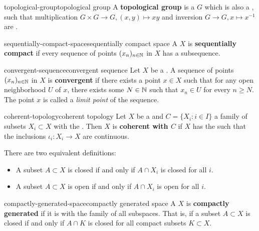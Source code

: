 \begin{topic}{topological-group}{topological group}
    A \textbf{topological group} is a  $G$ which is also a , such that multiplication $G \times G \to G, (x, y) \mapsto xy$ and inversion $G \to G, x \mapsto x^{-1}$ are .
\end{topic}

\begin{topic}{sequentially-compact-space}{sequentially compact space}
    A  $X$ is \textbf{sequentially compact} if every sequence of points $(x_n)_{n \in \mathbb{N}}$ in $X$ has a  subsequence.
\end{topic}

\begin{topic}{convergent-sequence}{convergent sequence}
    Let $X$ be a . A sequence of points $(x_n)_{n \in \mathbb{N}}$ in $X$ is \textbf{convergent} if there exists a point $x \in X$ such that for any open neighborhood $U$ of $x$, there exists some $N \in \mathbb{N}$ such that $x_n \in U$ for every $n \ge N$. The point $x$ is called a \textit{limit point} of the sequence.
\end{topic}

\begin{topic}{coherent-topology}{coherent topology}
    Let $X$ be a  and $C = \{ X_i : i \in I \}$ a family of subsets $X_i \subset X$ with the . Then $X$ is \textbf{coherent with $C$} if $X$ has the  such that the inclusions $\iota_i : X_i \to X$ are continuous.
    
    There are two equivalent definitions:
    \begin{itemize}
        \item A subset $A \subset X$ is closed if and only if $A \cap X_i$ is closed for all $i$.
        \item A subset $A \subset X$ is open if and only if $A \cap X_i$ is open for all $i$.
    \end{itemize}
\end{topic}

\begin{topic}{compactly-generated-space}{compactly generated space}
    A  $X$ is \textbf{compactly generated} if it is  with the family of all  subspaces. That is, if a subset $A \subset X$ is closed if and only if $A \cap K$ is closed for all compact subsets $K \subset X$.
\end{topic}

